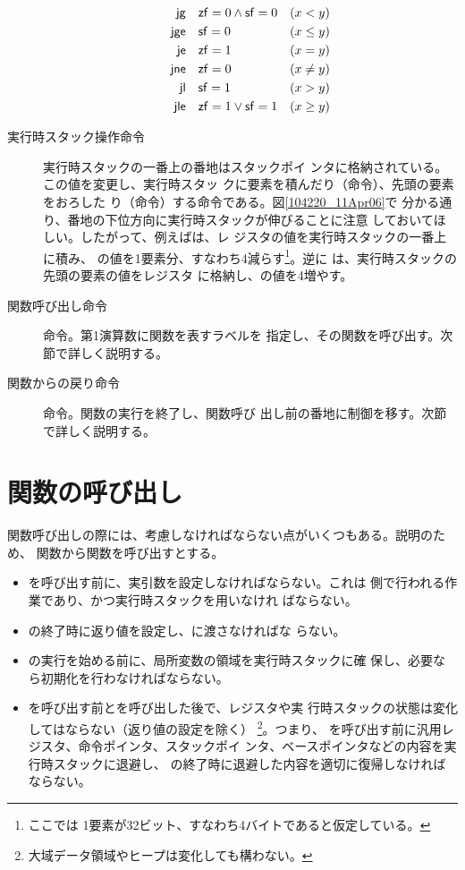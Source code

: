 \begin{description}
\begin{align*}
	     {\sf jg} &&& {\sf zf}=0 \wedge {\sf sf}=0 & (x < y)\\
	     {\sf jge} &&& {\sf sf}=0 & (x \leq y)\\
	     {\sf je} &&& {\sf zf}=1 & (x = y)\\
	     {\sf jne} &&& {\sf zf}=0 & (x \neq y)\\
	     {\sf jl} & & & {\sf sf}=1 & (x > y)\\
	     {\sf jle} & & & {\sf zf}=1 \vee {\sf sf}=1 & (x \geq y)
	    \end{align*}
 \item[実行時スタック操作命令] 実行時スタックの一番上の番地はスタックポイ
	    ンタに格納されている。この値を変更し、実行時スタッ
	    クに要素を積んだり（命令）、先頭の要素をおろした
	    り（命令）する命令である。図\ref{104220_11Apr06}で
	    分かる通り、番地の下位方向に実行時スタックが伸びることに注意
	    しておいてほしい。したがって、例えばは、レ
	    ジスタの値を実行時スタックの一番上に積み、
	    の値を1要素分、すなわち4減らす\footnote{ここでは
	    1要素が32ビット、すなわち4バイトであると仮定している。}。逆に
	    は、実行時スタックの先頭の要素の値をレジスタ
	    に格納し、の値を4増やす。
 \item[関数呼び出し命令] 命令。第1演算数に関数を表すラベルを
	    指定し、その関数を呼び出す。次節で詳しく説明する。
 \item[関数からの戻り命令] 命令。関数の実行を終了し、関数呼び
	    出し前の番地に制御を移す。次節で詳しく説明する。
\end{description}

\section{関数の呼び出し}
\label{181902_17Apr06}

関数呼び出しの際には、考慮しなければならない点がいくつもある。説明のため、
関数から関数を呼び出すとする。
\begin{itemize}
 \item {}を呼び出す前に、実引数を設定しなければならない。これは
       側で行われる作業であり、かつ実行時スタックを用いなけれ
       ばならない。
 \item {}の終了時に返り値を設定し、に渡さなければな
       らない。
 \item {}の実行を始める前に、局所変数の領域を実行時スタックに確
       保し、必要なら初期化を行わなければならない。
 \item {}を呼び出す前とを呼び出した後で、レジスタや実
       行時スタックの状態は変化してはならない（返り値の設定を除く）
       \footnote{大域データ領域やヒープは変化しても構わない。}。つまり、
       を呼び出す前に汎用レジスタ、命令ポインタ、スタックポイ
       ンタ、ベースポインタなどの内容を実行時スタックに退避し、
       の終了時に退避した内容を適切に復帰しなければならない。
\end{itemize}

